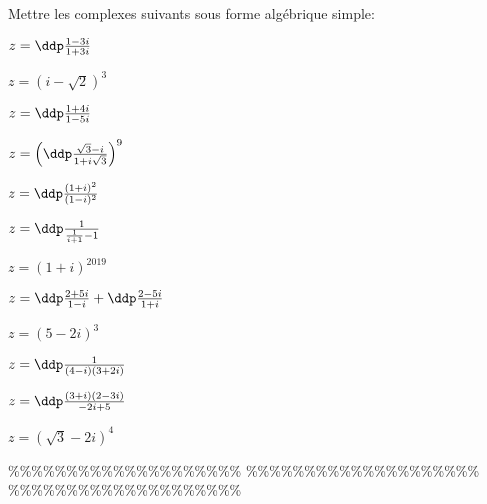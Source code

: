 



\begin{exercice}  \;
Mettre les complexes suivants sous forme alg\'ebrique simple:
\begin{enumerate}
\begin{minipage}[t]{0.3\textwidth}
\item $z=\ddp\frac{1-3i}{1+3i}$ 
\item $z=(i-\sqrt{2})^3$
\item $z=\ddp\frac{1+4i}{1-5i}$ 
\item  $z=\left(\ddp\frac{\sqrt{3}-i}{1+i\sqrt{3}}  \right)^9$
\end{minipage}
\begin{minipage}[t]{0.3\textwidth}
\item $z=\ddp\frac{(1+i)^2}{(1-i)^2}$
\item $z=\ddp\frac{1}{\frac{1}{i+1}-1}$
\item $z=(1+i)^{2019}$
\item $z=\ddp\frac{2+5i}{1-i}+\ddp\frac{2-5i}{1+i}$
\end{minipage}
\begin{minipage}[t]{0.3\textwidth}
\item $z=(5-2i)^3$ 
\item $z=\ddp\frac{1}{(4-i)(3+2i)}$ 
\item $z=\ddp\frac{(3+i)(2-3i)}{-2i+5}$
\item $z=(\sqrt{3}-2i)^4$
\end{minipage}
\end{enumerate}
\end{exercice}


\%\%\%\%\%\%\%\%\%\%\%\%\%\%\%\%\%\%\%\%
\%\%\%\%\%\%\%\%\%\%\%\%\%\%\%\%\%\%\%\%
\%\%\%\%\%\%\%\%\%\%\%\%\%\%\%\%\%\%\%\%





